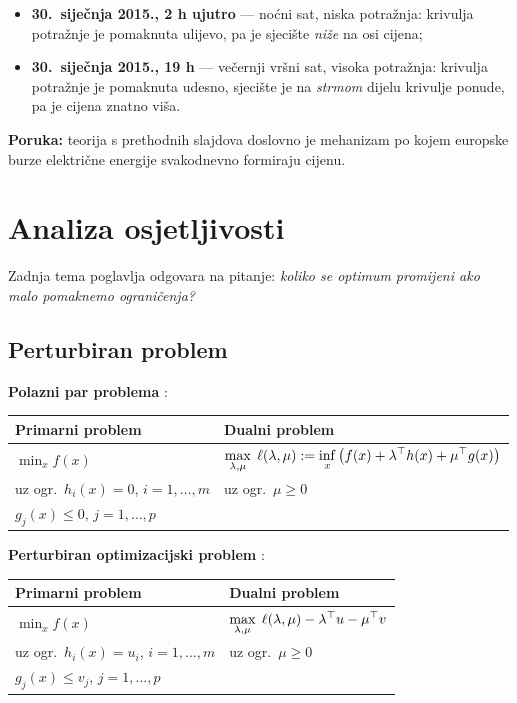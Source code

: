 \begin{itemize}
  \item \textbf{30.\ siječnja 2015., 2 h ujutro} --- noćni sat, niska
        potražnja: krivulja potražnje je pomaknuta ulijevo, pa je sjecište
        \emph{niže} na osi cijena;
  \item \textbf{30.\ siječnja 2015., 19 h} --- večernji vršni sat, visoka
        potražnja: krivulja potražnje je pomaknuta udesno, sjecište je na
        \emph{strmom} dijelu krivulje ponude, pa je cijena znatno viša.
\end{itemize}

\textbf{Poruka:} teorija s prethodnih slajdova doslovno je mehanizam po kojem
europske burze električne energije svakodnevno formiraju cijenu.

\section{Analiza osjetljivosti}
\label{sec:osjetljivost}

Zadnja tema poglavlja odgovara na pitanje: \emph{koliko se optimum promijeni ako
malo pomaknemo ograničenja?}

\subsection{Perturbiran problem}

\textbf{Polazni par problema} :

\begin{center}
\begin{tabular}{P{6.3cm}P{7.0cm}}
\toprule
\textbf{Primarni problem} & \textbf{Dualni problem} \\
\midrule
$\displaystyle\min_x f(x)$ &
$\displaystyle\max_{\lambda,\mu}\;
\ell(\lambda,\mu) := \inf_x\big(f(x) + \lambda^{\top} h(x) + \mu^{\top} g(x)\big)$ \\
uz ogr.\ $h_i(x) = 0$, $i=1,\dots,m$ & uz ogr.\ $\mu \ge 0$ \\
\phantom{uz ogr.\ }$g_j(x) \le 0$, $j=1,\dots,p$ & \\
\bottomrule
\end{tabular}
\end{center}

\textbf{Perturbiran optimizacijski problem} :

\begin{center}
\begin{tabular}{P{6.3cm}P{7.0cm}}
\toprule
\textbf{Primarni problem} & \textbf{Dualni problem} \\
\midrule
$\displaystyle\min_x f(x)$ &
$\displaystyle\max_{\lambda,\mu}\;
\ell(\lambda,\mu) - \lambda^{\top} u - \mu^{\top} v$ \\
uz ogr.\ $h_i(x) = u_i$, $i=1,\dots,m$ & uz ogr.\ $\mu \ge 0$ \\
\phantom{uz ogr.\ }$g_j(x) \le v_j$, $j=1,\dots,p$ & \\
\bottomrule
\end{tabular}
\end{center}

